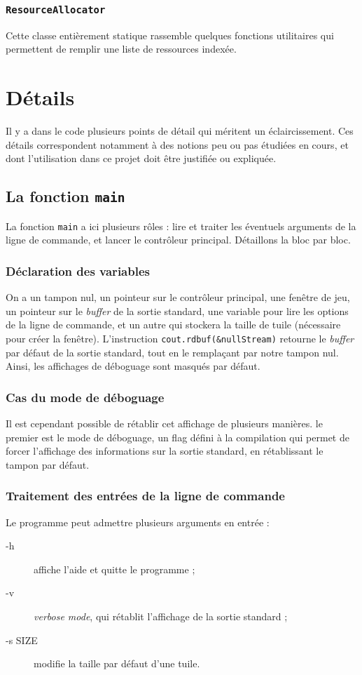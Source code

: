 \documentclass[a4paper,10pt]{report}
\begin{document}
\subsubsection{\texttt{ResourceAllocator}}

Cette classe entièrement statique rassemble quelques fonctions utilitaires qui permettent de remplir une liste de ressources indexée.

\section{Détails}
Il y a dans le code plusieurs points de détail qui méritent un éclaircissement. Ces détails correspondent notamment à des notions peu ou pas étudiées en cours, et dont l'utilisation dans ce projet doit être justifiée ou expliquée.
\subsection{La fonction \texttt{main}}

La fonction \texttt{main} a ici plusieurs rôles : lire et traiter les éventuels arguments de la ligne de commande, et lancer le contrôleur principal. Détaillons la bloc par bloc.
\subsubsection{Déclaration des variables}
On a un tampon nul, un pointeur sur le contrôleur principal, une fenêtre de jeu, un pointeur sur le \textit{buffer} de la sortie standard, une variable pour lire les options de la ligne de commande, et un autre qui stockera la taille de tuile (nécessaire pour créer la fenêtre). L'instruction \texttt{cout.rdbuf(\&nullStream)} retourne le \textit{buffer} par défaut de la sortie standard, tout en le remplaçant par notre tampon nul. Ainsi, les affichages de déboguage sont masqués par défaut.
\subsubsection{Cas du mode de déboguage}
Il est cependant possible de rétablir cet affichage de plusieurs manières. le premier est le mode de déboguage, un flag défini à la compilation qui permet de forcer l'affichage des informations sur la sortie standard, en rétablissant le tampon par défaut. 
\subsubsection{Traitement des entrées de la ligne de commande}
Le programme peut admettre plusieurs arguments en entrée : 
\begin{description}
 \item[-h] affiche l'aide et quitte le programme ;
 \item[-v] \textit{verbose mode}, qui rétablit l'affichage de la sortie standard ;
 \item[-s SIZE] modifie la taille par défaut d'une tuile. 
\end{description}
\end{document}
